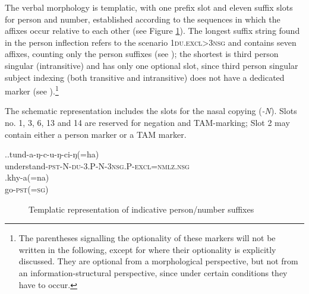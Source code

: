 The verbal morphology is  templatic, with one prefix slot and eleven suffix slots for person and number, established according to the sequences in which the affixes occur relative to each other (see Figure \ref{agr-list}). The longest suffix string found in the person inflection refers to the scenario {\scshape 1du.excl>3nsg} and contains seven affixes,  counting only the person suffixes (see \Next[a]); the shortest is third person singular (intransitive) and has only one optional slot, since third person singular subject indexing (both transitive and intransitive) does not have a dedicated marker (see \Next[b]).\footnote{The parentheses signalling the optionality of these markers will not be written in the following, except for where their optionality is explicitly discussed. They are optional from a morphological perspective, but not from an information-structural perspective, since under certain conditions they have to occur.}

The schematic representation includes the slots for the nasal copying (\emph{-N}). Slots no. 1, 3, 6,  13 and 14 are reserved for negation and TAM-marking; Slot 2 may contain either a person marker or a TAM marker. 

\ex.\ag.tund-a-ŋ-c-u-ŋ-ci-ŋ(=ha)\\
understand{\scshape -pst-N-du-3.P-N-3nsg.P-excl=nmlz.nsg}\\
\bg.khy-a(=na)\\
go{\scshape -pst(=sg)}\\

\begin{figure}[htp]
\caption{Templatic representation of indicative person/number suffixes}\label{agr-list}
\end{figure} 



